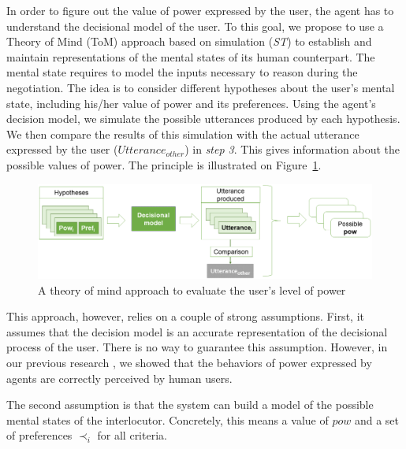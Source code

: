 \documentclass[conference, letterpaper]{IEEEtran}
\begin{document}
	In order to figure out the value of power expressed by the user, the agent has to understand the decisional model of the user. To this goal, we propose to use a Theory of Mind (ToM) approach \cite{premack1978does} based on simulation (\emph{ST}) to establish and maintain representations of the mental states of its human counterpart. 
	The mental state requires to model the inputs necessary to reason during the negotiation. The idea is to consider different hypotheses about the user's mental state, including his/her value of power and its preferences. Using the agent's decision model, we simulate the possible utterances produced by each hypothesis. 
	We then compare the results of this simulation with the actual utterance expressed by the user ($Utterance_{other}$) in \textit{step 3}. This gives information about the possible values of power. The principle is illustrated on Figure~\ref{fig:tom}.
	
	\begin{figure}
		\centering
		\includegraphics[width=0.8\linewidth]{figs/model/tom_select.png}
		\caption{A theory of mind approach to evaluate the user's level of power} 
		\label{fig:tom}
	\end{figure} 
	
	This approach, however, relies on a couple of strong assumptions. First, it assumes that the decision model is an accurate representation of the decisional process of the user. There is no way to guarantee this assumption. However, in our previous research \cite{ouali2017computational}, we showed that the behaviors of power expressed by agents are correctly perceived by human users. 
	
	The second assumption is that the system can build a model of the possible mental states of the interlocutor. Concretely, this means a value of $pow$ and a set of preferences $\prec_i$ for all criteria. 
	
\end{document}
